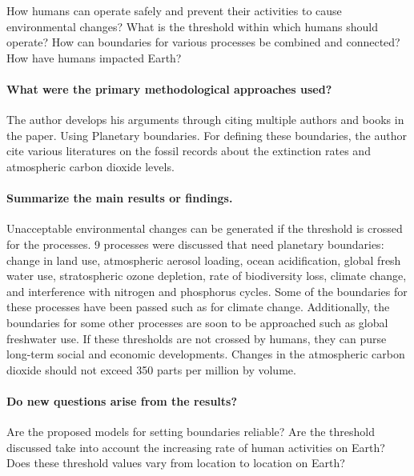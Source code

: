 \documentclass[]{article}
\let\oldparagraph\paragraph
\renewcommand{\paragraph}[1]{\oldparagraph{#1}\mbox{}}
\begin{document}
How humans can operate safely and prevent their activities to cause
environmental changes? What is the threshold within which humans should
operate? How can boundaries for various processes be combined and
connected? How have humans impacted Earth?

\paragraph{What were the primary methodological approaches
used?}\label{what-were-the-primary-methodological-approaches-used-1}

The author develops his arguments through citing multiple authors and
books in the paper. Using Planetary boundaries. For defining these
boundaries, the author cite various literatures on the fossil records
about the extinction rates and atmospheric carbon dioxide levels.

\paragraph{Summarize the main results or
findings.}\label{summarize-the-main-results-or-findings.-1}

Unacceptable environmental changes can be generated if the threshold is
crossed for the processes. 9 processes were discussed that need
planetary boundaries: change in land use, atmospheric aerosol loading,
ocean acidification, global fresh water use, stratospheric ozone
depletion, rate of biodiversity loss, climate change, and interference
with nitrogen and phosphorus cycles. Some of the boundaries for these
processes have been passed such as for climate change. Additionally, the
boundaries for some other processes are soon to be approached such as
global freshwater use. If these thresholds are not crossed by humans,
they can purse long-term social and economic developments. Changes in
the atmospheric carbon dioxide should not exceed 350 parts per million
by volume.

\paragraph{Do new questions arise from the
results?}\label{do-new-questions-arise-from-the-results-1}

Are the proposed models for setting boundaries reliable? Are the
threshold discussed take into account the increasing rate of human
activities on Earth? Does these threshold values vary from location to
location on Earth?
\end{document}
